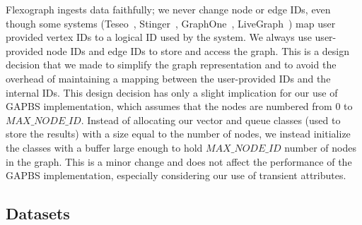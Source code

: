 Flexograph ingests data faithfully; we never change node or edge IDs, even though some systems (Teseo~\cite{teseo2021deLeo}, Stinger~\cite{stinger2012ediger}, GraphOne~\cite{graphone2019kumar}, LiveGraph~\cite{zhu2019livegraph}) map user provided vertex IDs to a logical ID used by the system.
We always use user-provided node IDs and edge IDs to store and access the graph.
This is a design decision that we made to simplify the graph representation and to avoid the overhead of maintaining a mapping between the user-provided IDs and the internal IDs.
This design decision has only a slight implication for our use of \ac{GAPBS} implementation, which assumes that the nodes are numbered from 0 to $MAX\_NODE\_ID$.
Instead of allocating our vector and queue classes (used to store the results) with a size equal to the number of nodes, we instead initialize the classes with a buffer large enough to hold $MAX\_NODE\_ID$ number of nodes in the graph.
This is a minor change and does not affect the performance of the \ac{GAPBS} implementation, especially considering our use of transient attributes. 

\subsection{Datasets}
\label{eval:datasets}

